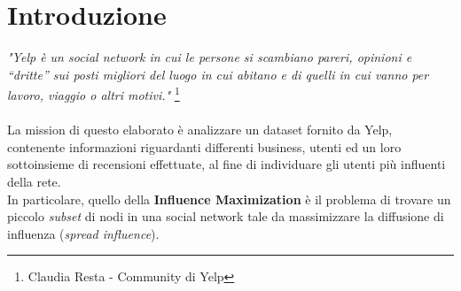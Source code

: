 
\chapter{Introduzione}
\textit{"Yelp è un social network in cui le persone si
scambiano pareri,  opinioni e “dritte” sui posti migliori del luogo in cui
abitano e di  quelli in cui vanno per lavoro, viaggio o altri motivi."}
\footnote{Claudia Resta - Community di Yelp}\\\\
La mission di questo elaborato è
analizzare un dataset fornito da Yelp,  contenente informazioni riguardanti
differenti business, utenti ed un  loro sottoinsieme di recensioni effettuate,
al fine di individuare gli  utenti più influenti della rete.\\
 In particolare,
quello della \textbf{Influence Maximization} è il  problema di trovare un
piccolo \textit{subset} di nodi in una social  network tale da  massimizzare la
diffusione di influenza  (\textit{spread influence}).

